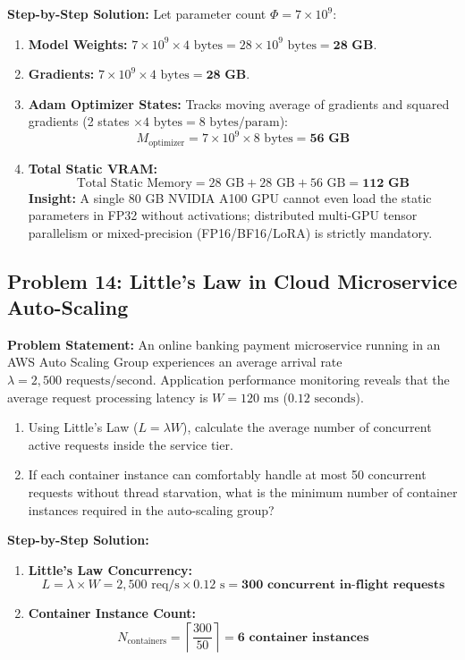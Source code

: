 \textbf{Step-by-Step Solution:}
Let parameter count $\Phi = 7 \times 10^9$:
\begin{enumerate}[label=(\alph*)]
    \item \textbf{Model Weights:} $7 \times 10^9 \times 4\text{ bytes} = 28\times 10^9\text{ bytes} = \mathbf{28\text{ GB}}$.
    \item \textbf{Gradients:} $7 \times 10^9 \times 4\text{ bytes} = \mathbf{28\text{ GB}}$.
    \item \textbf{Adam Optimizer States:} Tracks moving average of gradients and squared gradients (2 states $\times 4\text{ bytes} = 8\text{ bytes/param}$):
    \[
    M_{\text{optimizer}} = 7 \times 10^9 \times 8\text{ bytes} = \mathbf{56\text{ GB}}
    \]
    \item \textbf{Total Static VRAM:}
    \[
    \text{Total Static Memory} = 28\text{ GB} + 28\text{ GB} + 56\text{ GB} = \mathbf{112\text{ GB}}
    \]
    \textbf{Insight:} A single 80 GB NVIDIA A100 GPU cannot even load the static parameters in FP32 without activations; distributed multi-GPU tensor parallelism or mixed-precision (FP16/BF16/LoRA) is strictly mandatory.
\end{enumerate}

\subsection*{Problem 14: Little's Law in Cloud Microservice Auto-Scaling}
\textbf{Problem Statement:} An online banking payment microservice running in an AWS Auto Scaling Group experiences an average arrival rate $\lambda = 2,500\text{ requests/second}$. Application performance monitoring reveals that the average request processing latency is $W = 120\text{ ms}$ ($0.12\text{ seconds}$).
\begin{enumerate}[label=(\alph*)]
    \item Using Little's Law ($L = \lambda W$), calculate the average number of concurrent active requests inside the service tier.
    \item If each container instance can comfortably handle at most 50 concurrent requests without thread starvation, what is the minimum number of container instances required in the auto-scaling group?
\end{enumerate}

\textbf{Step-by-Step Solution:}
\begin{enumerate}[label=(\alph*)]
    \item \textbf{Little's Law Concurrency:}
    \[
    L = \lambda \times W = 2,500\text{ req/s} \times 0.12\text{ s} = \mathbf{300\text{ concurrent in-flight requests}}
    \]
    \item \textbf{Container Instance Count:}
    \[
    N_{\text{containers}} = \left\lceil \frac{300}{50} \right\rceil = \mathbf{6\text{ container instances}}
    \]
\end{enumerate}

